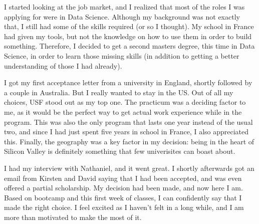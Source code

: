 \documentclass[]{article}
\begin{document}
I started looking at the job market, and I realized that most of the roles I was applying for were in Data Science. Although my background was not exactly that, I still had some of the skills required (or so I thought). My school in France had given my tools, but not the knowledge on how to use them in order to build something. Therefore, I decided to get a second masters degree, this time in Data Science, in order to learn those missing skills (in addition to getting a better understanding of those I had already).

I got my first acceptance letter from a university in England, shortly followed by a couple in Australia. But I really wanted to stay in the US. Out of all my choices, USF stood out as my top one. The practicum was a deciding factor to me, as it would be the perfect way to get actual work experience while in the program. This was also the only program that lasts one year instead of the usual two, and since I had just spent five years in school in France, I also appreciated this. Finally, the geography was a key factor in my decision: being in the heart of Silicon Valley is definitely something that few univerisites can boast about.

I had my interview with Nathaniel, and it went great. I shortly afterwards got an email from Kirsten and David saying that I had been accepted, and was even offered a partial scholarship. My decision had been made, and now here I am. Based on bootcamp and this first week of classes, I can confidently say that I made the right choice. I feel excited as I haven't felt in a long while, and I am more than motivated to make the most of it.
\end{document}
